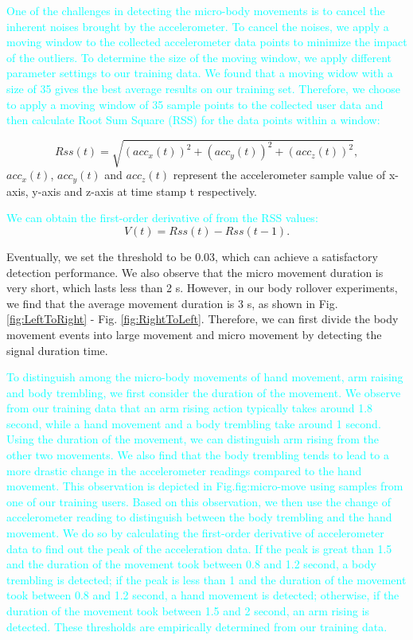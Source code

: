 \textcolor{cyan}{One of the challenges in detecting the micro-body movements is to cancel the inherent noises brought by the accelerometer.
To cancel the noises, we apply a moving window to the collected accelerometer data points to minimize the impact of the outliers. To
determine the size of the moving window, we apply different parameter settings to our training data. We found that a moving widow with a
size of 35 gives the best average results on our training set. Therefore, we choose to apply a moving window of 35 sample points to the
collected user data and then calculate Root Sum Square (RSS) for the data points within a window:}

\begin{equation}
      Rss(t) =\sqrt{(acc_x(t))^{2}+(acc_y(t))^{2}+(acc_z(t))^{2}},
\end{equation}
$acc_x(t)$, $acc_y(t)$ and $acc_z(t)$ represent the accelerometer sample value of x-axis, y-axis and z-axis at time stamp t respectively.


\textcolor{cyan}{We can obtain the first-order derivative of from the RSS values:}
\begin{equation}
      V(t)=Rss(t)-Rss(t-1).
\end{equation}

Eventually, we set the threshold to be 0.03, which can achieve a satisfactory detection performance. We also observe that the micro movement duration is very short, which lasts less than 2 s.
However, in our body rollover experiments, we find that the average movement duration is 3 s, as shown in Fig. \ref{fig:LeftToRight} - Fig. \ref{fig:RightToLeft}.
Therefore, we can first divide the body movement events into large movement and micro movement by detecting the signal duration time.

\textcolor{cyan}{To distinguish among the micro-body movements of hand movement, arm raising and body trembling, we first consider the
duration of the movement. We observe from our training data that an arm rising action typically takes around 1.8 second, while a hand
movement and a body trembling take around 1 second. Using the duration of the movement, we can distinguish arm rising from the other two
movements. We also find that the body trembling tends to lead to a more drastic change in the accelerometer readings compared to the hand
movement. This observation is depicted in Fig.{fig:micro-move} using samples from one of our training users. Based on this observation, we
then use the change of accelerometer reading to distinguish between the body trembling and the hand movement. We do so by calculating the
first-order derivative of accelerometer data to find out the peak of the acceleration data.  If the peak is great than 1.5 and the duration
of the movement took between 0.8 and 1.2 second, a body trembling is detected; if the peak is less than 1 and the duration of the movement
took between 0.8 and 1.2 second, a hand movement is detected; otherwise, if the duration of the movement took between 1.5 and 2 second, an
arm rising is detected. These thresholds are empirically determined from our training data.}

